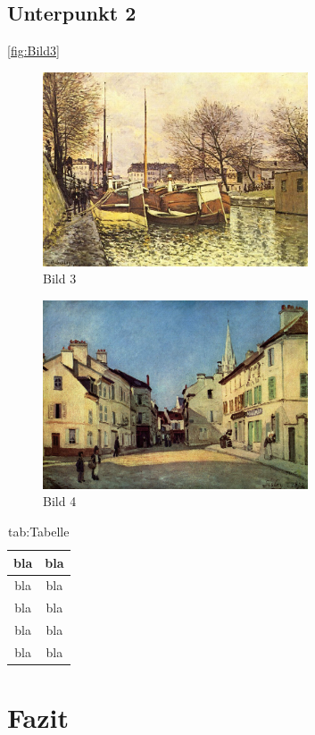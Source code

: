 \documentclass[
	A4paper,
	DIV=9,
	BCOR7mm,
	smallheadings,
	headinclude,
	footinclude,
	headsepline,
	parindent,
	german,
	captions=tableheading,
	abstracton
	]{scrreprt}
\begin{document}
\blindtext[1]{}\autocite{:Keshk_2014}
\section{Unterpunkt 2}
\blindtext[1]{}\autocite{:Aydin_2009}

\blindtext[1]{}\autoref{fig:Bild3}
\blindtext[1]{}\autocite{:Muelhardt_2013}
\begin{figure}[htbp]
\begin{center}
\includegraphics[width=0.7\textwidth]{Abbildungen/Bild3.jpg}
\caption{Bild 3}
\label{fig:Bild3}
\end{center}
\end{figure}

\blindtext[2]{}\autocite{:Geschwinde_Rauschdrogen}
\begin{figure}[htbp]
\begin{center}
\includegraphics[width=0.7\textwidth]{Abbildungen/Bild4.jpg}
\caption{Bild 4}
\label{fig:Bild4}
\end{center}
\end{figure}

\blindtext[1]{}
\begin{table}[]
\caption{tab:Tabelle}
\begin{center}
\begin{tabular}{|c|c|}
\hline
bla & bla \\
\hline
\hline
bla & bla \\
bla & bla \\
bla & bla \\
bla & bla \\
\hline
\end{tabular}
\end{center}
\label{default}
\end{table}%

\chapter{Fazit}
\blindtext[1]{}

\blindtext[2]{}

\blindtext[2]{}

\blindtext[1]{}

\printbibliography
\end{document}
